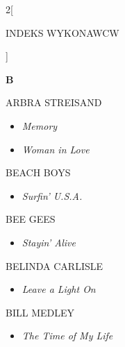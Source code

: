 \documentclass[a4paper]{report}
\begin{document}
\begin{multicols*}{2}[\begin{Huge}INDEKS WYKONAWCW\end{Huge}\vspace{1cm}]
\begin{minipage}{\columnwidth}
\end{minipage}
\begin{minipage}{\columnwidth}
	\begin{Large}\textbf{B}\end{Large}ARBRA STREISAND 
	\begin{itemize}[topsep=3pt, after=\vspace{3mm}]
		\itemsep0em
		\item[]\textit{Memory}  \\
		\item[]  \textit{Woman in Love}  \\
	\end{itemize}
\end{minipage}
\begin{minipage}{\columnwidth}
	BEACH BOYS 
	\begin{itemize}[topsep=3pt, after=\vspace{3mm}]
		\itemsep0em
		\item[]\textit{Surfin' U.S.A.}  \\
	\end{itemize}
\end{minipage}
\begin{minipage}{\columnwidth}
	BEE GEES 
	\begin{itemize}[topsep=3pt, after=\vspace{3mm}]
		\itemsep0em
		\item[]\textit{Stayin' Alive}  \\
	\end{itemize}
\end{minipage}
\begin{minipage}{\columnwidth}
	BELINDA CARLISLE 
	\begin{itemize}[topsep=3pt, after=\vspace{3mm}]
		\itemsep0em
		\item[]\textit{Leave a Light On}  \\
	\end{itemize}
\end{minipage}
\begin{minipage}{\columnwidth}
	BILL MEDLEY 
	\begin{itemize}[topsep=3pt, after=\vspace{3mm}]
		\itemsep0em
		\item[]\textit{The Time of My Life}  \\
	\end{itemize}
\end{minipage}

\end{multicols*}
\end{document}
